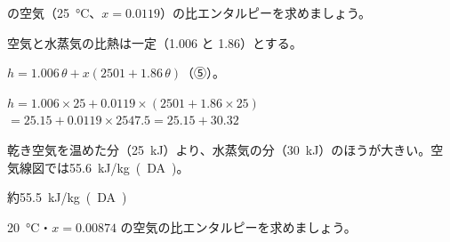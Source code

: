 \begin{reidai}[湿り空気の比エンタルピー]
\label{ph:熱-9:ex3}の空気（\qty{25}{\celsius}、$x=0.0119$）の比エンタルピーを求めましょう。
\par{} 空気と水蒸気の比熱は一定（1.006 と 1.86）とする。
\par\kangaekata $h=1.006\,\theta+x(2501+1.86\,\theta)$（⑤）。
\par\shiki $h=1.006\times25+0.0119\times(2501+1.86\times25)$\\ \hspace*{2\zw}$=25.15+0.0119\times2547.5=25.15+30.32$
\par{} 乾き空気を温めた分（\qty{25}{kJ}）より、水蒸気の分（\qty{30}{kJ}）のほうが大きい。空気線図では\qty{55.6}{kJ/kg(DA)}。
\par\kotae 約\qty{55.5}{kJ/kg(DA)}
\end{reidai}
\begin{jibun}
\qty{20}{\celsius}・$x=0.00874$ の空気の比エンタルピーを求めましょう。
\end{jibun}

